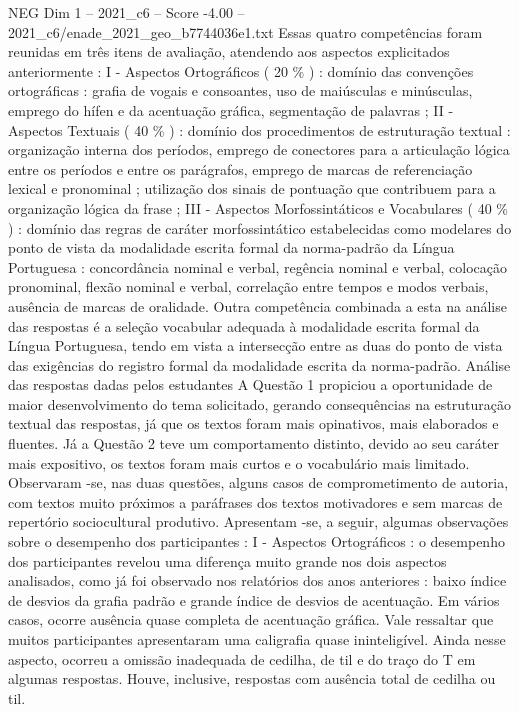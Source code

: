 \begin{textsample}{NEG Dim 1 – 2021\_c6 – Score -4.00 – 2021\_c6/enade\_2021\_geo\_b7744036e1.txt}
Essas quatro competências foram reunidas em três itens de avaliação, atendendo aos aspectos explicitados anteriormente : I - Aspectos Ortográficos ( 20 \% ) : domínio das convenções ortográficas : grafia de vogais e consoantes, uso de maiúsculas e minúsculas, emprego do hífen e da acentuação gráfica, segmentação de palavras ; II - Aspectos Textuais ( 40 \% ) : domínio dos procedimentos de estruturação textual : organização interna dos períodos, emprego de conectores para a articulação lógica entre os períodos e entre os parágrafos, emprego de marcas de referenciação lexical e pronominal ; utilização dos sinais de pontuação que contribuem para a organização lógica da frase ; III - Aspectos Morfossintáticos e Vocabulares ( 40 \% ) : domínio das regras de caráter morfossintático estabelecidas como modelares do ponto de vista da modalidade escrita formal da norma-padrão da Língua Portuguesa : concordância nominal e verbal, regência nominal e verbal, colocação pronominal, flexão nominal e verbal, correlação entre tempos e modos verbais, ausência de marcas de oralidade.
Outra competência combinada a esta na análise das respostas é a seleção vocabular adequada à modalidade escrita formal da Língua Portuguesa, tendo em vista a intersecção entre as duas do ponto de vista das exigências do registro formal da modalidade escrita da norma-padrão.
Análise das respostas dadas pelos estudantes A Questão 1 propiciou a oportunidade de maior desenvolvimento do tema solicitado, gerando consequências na estruturação textual das respostas, já que os textos foram mais opinativos, mais elaborados e fluentes.
Já a Questão 2 teve um comportamento distinto, devido ao seu caráter mais expositivo, os textos foram mais curtos e o vocabulário mais limitado.
Observaram -se, nas duas questões, alguns casos de comprometimento de autoria, com textos muito próximos a paráfrases dos textos motivadores e sem marcas de repertório sociocultural produtivo.
Apresentam -se, a seguir, algumas observações sobre o desempenho dos participantes : I - Aspectos Ortográficos : o desempenho dos participantes revelou uma diferença muito grande nos dois aspectos analisados, como já foi observado nos relatórios dos anos anteriores : baixo índice de desvios da grafia padrão e grande índice de desvios de acentuação.
Em vários casos, ocorre ausência quase completa de acentuação gráfica.
Vale ressaltar que muitos participantes apresentaram uma caligrafia quase ininteligível.
Ainda nesse aspecto, ocorreu a omissão inadequada de cedilha, de til e do traço do T em algumas respostas.
Houve, inclusive, respostas com ausência total de cedilha ou til.

\end{textsample}
